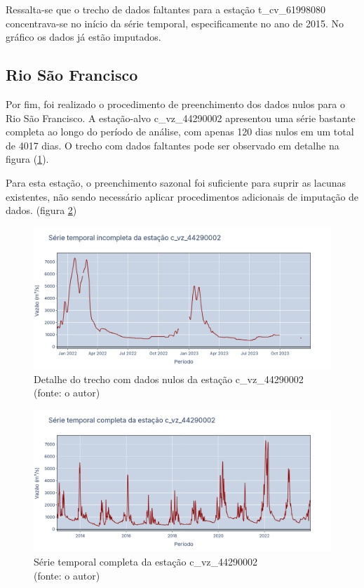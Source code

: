 Ressalta-se que o trecho de dados faltantes para a estação t\_cv\_61998080 concentrava-se no início da série temporal, especificamente no ano de 2015. No gráfico os dados já estão imputados.

\clearpage
\subsection{Rio São Francisco}

Por fim, foi realizado o procedimento de preenchimento dos dados nulos para o Rio São Francisco. A estação-alvo c\_vz\_44290002 apresentou uma série bastante completa ao longo do período de análise, com apenas 120 dias nulos em um total de 4017 dias. O trecho com dados faltantes pode ser observado em detalhe na figura (\ref{fig:franciscoSerieIncompleta_c_vz_44290002-detalhe}).

Para esta estação, o preenchimento sazonal foi suficiente para suprir as lacunas existentes, não sendo necessário aplicar procedimentos adicionais de imputação de dados. (figura \ref{fig:franciscoSerieCompleta_c_vz_44290002})

\begin{figure}[!h]
	\centering
	\includegraphics[scale=0.25]{Figuras/rio_sao_francisco/franciscoSerieIncompleta_c_vz_44290002-detalhe.png}
	\caption{Detalhe do trecho com dados nulos da estação c\_vz\_44290002\\(fonte: o autor)}
	\label{fig:franciscoSerieIncompleta_c_vz_44290002-detalhe}
\end{figure}

\begin{figure}[!h]
	\centering
	\includegraphics[scale=0.25]{Figuras/rio_sao_francisco/franciscoSerieCompleta_c_vz_44290002.png}
	\caption{Série temporal completa da estação c\_vz\_44290002\\(fonte: o autor)}
	\label{fig:franciscoSerieCompleta_c_vz_44290002}
\end{figure}
\clearpage

